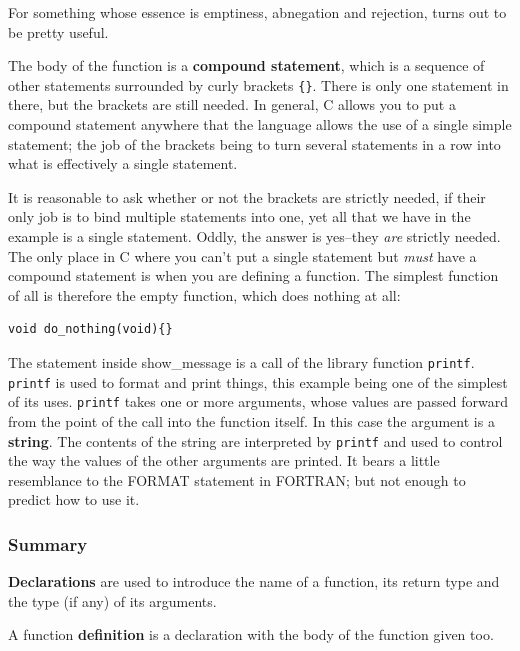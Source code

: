    For something whose essence is emptiness, abnegation and rejection,
     \void{} turns out to be pretty useful.


    The body of the function is a \textbf{compound statement}, which is a
     sequence of other statements surrounded by curly
     brackets \texttt{\{\}}. There is only one statement in there, but
     the brackets are still needed. In general, C allows you to put a compound
     statement anywhere that the language allows the use of a single simple
     statement; the job of the brackets being to turn several statements in a
     row into what is effectively a single statement.


    It is reasonable to ask whether or not the brackets are strictly needed,
     if their only job is to bind multiple statements into one, yet all that we
     have in the example is a single statement. Oddly, the answer is
     yes--they \textit{are} strictly needed. The only place in C where you
     can't put a single statement but \textit{must} have a compound statement
     is when you are defining a function. The simplest function of all is
     therefore the empty function, which does nothing at all:


    \begin{Verbatim}
void do_nothing(void){}
\end{Verbatim}

    The statement inside show\_message is a call of the library function
     \texttt{printf}. \texttt{printf} is used to format and print
     things, this example being one of the simplest of its
     uses. \texttt{printf} takes one or more arguments, whose values are
     passed forward from the point of the call into the function itself. In
     this case the argument is a \textbf{string}. The contents of the string
     are interpreted by \texttt{printf} and used to control the way the
     values of the other arguments are printed. It bears a little resemblance
     to the FORMAT statement in FORTRAN; but not enough to predict how to use
     it.


   

   \subsubsection{Summary}
    \textbf{Declarations} are used to introduce the name of a function,
     its return type and the type (if any) of its arguments.

    A function \textbf{definition} is a declaration with the body of the
     function given too.

